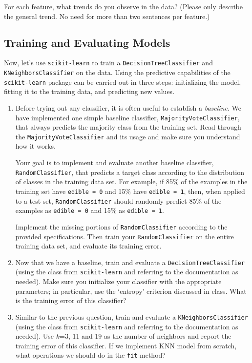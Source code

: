 For each feature, what trends do you observe in the data? (Please only describe the general trend. No need for more than two sentences per feature.) 

\subsection{Training and Evaluating Models }

Now, let's use \verb|scikit-learn| to train a \verb|DecisionTreeClassifier| and \verb|KNeighborsClassifier| on the data.
Using the predictive capabilities of the \verb|scikit-learn| package can be carried out in three steps: initializing the model, fitting it to the training data, and predicting new values.

\begin{enumerate}

\item {} Before trying out any classifier, it is often useful to establish a \emph{baseline}. We have implemented one simple baseline classifier, \verb|MajorityVoteClassifier|, that always predicts the majority class from the training set. Read through the \verb|MajorityVoteClassifier| and its usage and make sure you understand how it works.

Your goal is to implement and evaluate another baseline classifier, \verb|RandomClassifier|, that predicts a target class according to the distribution of classes in the training data set. For example, if 85\% of the examples in the training set have \verb|edible = 0| and 15\% have \verb|edible = 1|, then, when applied to a test set, \verb|RandomClassifier| should randomly predict 85\% of the examples as \verb|edible = 0| and 15\% as \verb|edible = 1|.

Implement the missing portions of \verb|RandomClassifier| according to the provided specifications. Then train your \verb|RandomClassifier| on the entire training data set, and evaluate its training error. 


\item {} Now that we have a baseline, train and evaluate a \verb|DecisionTreeClassifier| (using the class from \verb|scikit-learn| and referring to the documentation as needed). Make sure you initialize your classifier with the appropriate parameters; in particular, use the `entropy' criterion discussed in class. What is the training error of this classifier?




\item {} Similar to the previous question, train and evaluate a \verb|KNeighborsClassifier| (using the class from \verb|scikit-learn| and referring to the documentation as needed). Use $k$=3, 11 and 19 as the number of neighbors and report the training error of this classifier. If we implement KNN model from scratch, what operations we should do in the \verb|fit| method?



\end{enumerate}
